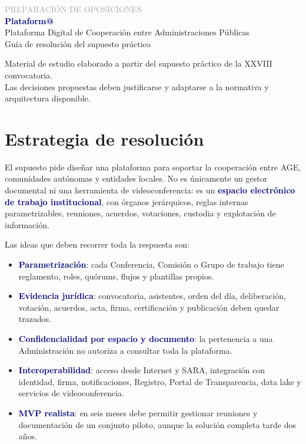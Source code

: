 \documentclass[11pt,a4paper]{article}
\newcommand{\key}[1]{\textbf{\textcolor{navy}{#1}}}
\begin{document}
\begin{titlepage}
\centering\vspace*{2cm}
{\Large\textcolor{darkgray}{PREPARACIÓN DE OPOSICIONES}}\\[1.2cm]
{\Huge\bfseries\textcolor{navy}{Plataform@}}\\[0.25cm]
{\Large Plataforma Digital de Cooperación entre Administraciones Públicas}\\[1.5cm]
{\large Guía de resolución del supuesto práctico}\\[2cm]
\vfill
\begin{minipage}{0.82\textwidth}\small\centering
Material de estudio elaborado a partir del supuesto práctico de la XXVIII convocatoria.\\
Las decisiones propuestas deben justificarse y adaptarse a la normativa y arquitectura disponible.
\end{minipage}\vspace{1cm}
\end{titlepage}

\tableofcontents\newpage

\section{Estrategia de resolución}

El supuesto pide diseñar una plataforma para soportar la cooperación entre AGE, comunidades autónomas y entidades locales. No es únicamente un gestor documental ni una herramienta de videoconferencia: es un \key{espacio electrónico de trabajo institucional}, con órganos jerárquicos, reglas internas parametrizables, reuniones, acuerdos, votaciones, custodia y explotación de información.

Las ideas que deben recorrer toda la respuesta son:
\begin{itemize}
\item \key{Parametrización}: cada Conferencia, Comisión o Grupo de trabajo tiene reglamento, roles, quórums, flujos y plantillas propios.
\item \key{Evidencia jurídica}: convocatoria, asistentes, orden del día, deliberación, votación, acuerdos, acta, firma, certificación y publicación deben quedar trazados.
\item \key{Confidencialidad por espacio y documento}: la pertenencia a una Administración no autoriza a consultar toda la plataforma.
\item \key{Interoperabilidad}: acceso desde Internet y SARA, integración con identidad, firma, notificaciones, Registro, Portal de Transparencia, data lake y servicios de videoconferencia.
\item \key{MVP realista}: en seis meses debe permitir gestionar reuniones y documentación de un conjunto piloto, aunque la solución completa tarde dos años.
\end{itemize}
\end{document}
